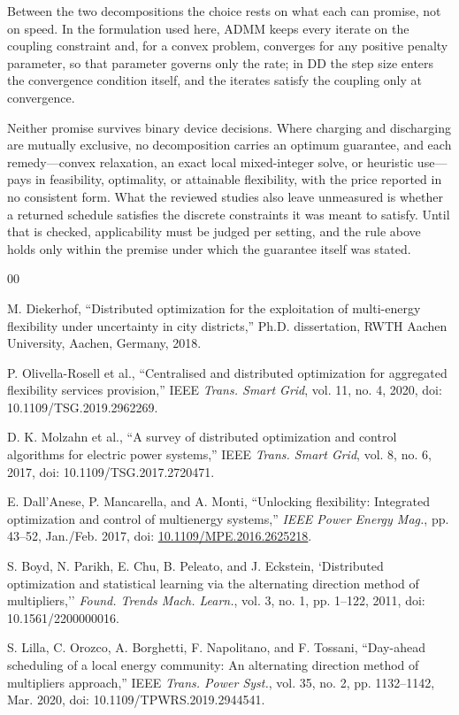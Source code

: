 \documentclass[conference]{IEEEtran}
\begin{document}
Between the two decompositions the choice rests on what each can promise, not on speed. In the formulation used here, ADMM keeps every iterate on the coupling constraint and, for a convex problem, converges for any positive penalty parameter, so that parameter governs only the rate; in DD the step size enters the convergence condition itself, and the iterates satisfy the coupling only at convergence.

Neither promise survives binary device decisions. Where charging and discharging are mutually exclusive, no decomposition carries an optimum guarantee, and each remedy---convex relaxation, an exact local mixed-integer solve, or heuristic use---pays in feasibility, optimality, or attainable flexibility, with the price reported in no consistent form. What the reviewed studies also leave unmeasured is whether a returned schedule satisfies the discrete constraints it was meant to satisfy. Until that is checked, applicability must be judged per setting, and the rule above holds only within the premise under which the guarantee itself was stated.

 \begin{thebibliography}{00}

M. Diekerhof, ``Distributed optimization for the exploitation
of multi-energy flexibility under uncertainty in city districts,''
Ph.D. dissertation, RWTH Aachen University, Aachen, Germany, 2018.

P. Olivella-Rosell et al., ``Centralised and distributed
optimization for aggregated flexibility services provision,''
IEEE \emph{Trans. Smart Grid}, vol. 11, no. 4, 2020,
doi: 10.1109/TSG.2019.2962269.

D. K. Molzahn et al., ``A survey of distributed optimization
and control algorithms for electric power systems,''
IEEE \emph{Trans. Smart Grid}, vol. 8, no. 6, 2017,
doi: 10.1109/TSG.2017.2720471.

E. Dall'Anese, P. Mancarella, and A. Monti,
``Unlocking flexibility: Integrated optimization and control
of multienergy systems,''
\emph{IEEE Power Energy Mag.}, pp. 43--52, Jan./Feb. 2017,
doi: \url{10.1109/MPE.2016.2625218}.

S. Boyd, N. Parikh, E. Chu, B. Peleato, and J. Eckstein,
`Distributed optimization and statistical learning via the alternating
direction method of multipliers,'' \emph{Found. Trends Mach. Learn.},
vol. 3, no. 1, pp. 1--122, 2011, doi: 10.1561/2200000016.

S. Lilla, C. Orozco, A. Borghetti, F. Napolitano, and F. Tossani,
``Day-ahead scheduling of a local energy community: An alternating
direction method of multipliers approach,''
IEEE \emph{Trans. Power Syst.}, vol. 35, no. 2, pp. 1132--1142, Mar. 2020,
doi: 10.1109/TPWRS.2019.2944541.

 \end{thebibliography}
\end{document}
